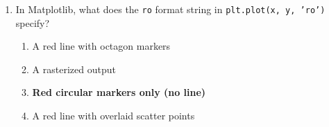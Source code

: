 \begin{enumerate}
    \item In Matplotlib, what does the \texttt{ro} format string in
          \texttt{plt.plot(x, y, 'ro')} specify?
    \begin{enumerate}
        \item A red line with octagon markers
        \item A rasterized output
        \item \textbf{Red circular markers only (no line)}
        \item A red line with overlaid scatter points
    \end{enumerate}

\end{enumerate}
